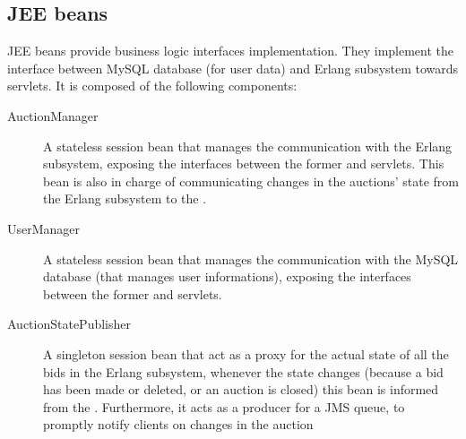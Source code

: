 \subsection{JEE beans}\label{subsec:archjee}

JEE beans provide business logic interfaces implementation. They implement the
interface between MySQL database (for user data) and Erlang subsystem towards
servlets. It is composed of the following components:

\begin{description}
	\item[AuctionManager] A stateless session bean that manages the
		communication with the Erlang subsystem, exposing the interfaces
		between the former and servlets. This bean is also in charge of
		communicating changes in the auctions’ state from the Erlang
		subsystem to the .
	\item[UserManager] A stateless session bean that manages the
		communication with the MySQL database (that manages user
		informations), exposing the interfaces between the former and
		servlets.
	\item[AuctionStatePublisher] A singleton session bean that act as a
		proxy for the actual state of all the bids in the Erlang
		subsystem, whenever the state changes (because a bid has been
		made or deleted, or an auction is closed) this bean is informed
		from the . Furthermore, it acts as a
		producer for a JMS queue, to promptly notify clients on changes
		in the auction
\end{description}
